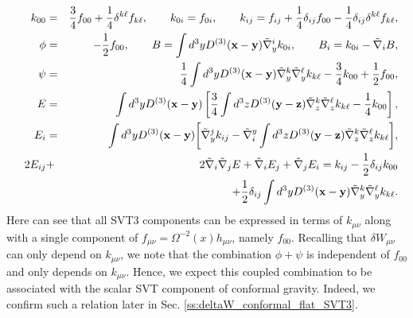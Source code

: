 \begin{eqnarray}
k_{00}&=&\frac{3}{4}f_{00}+\frac{1}{4}\delta^{k\ell}f_{k\ell},\qquad k_{0i}=f_{0i},\qquad k_{ij}=f_{ij}+\frac{1}{4}\delta_{ij}f_{00}-\frac{1}{4}\delta_{ij}\delta^{k\ell}f_{k\ell},
\nonumber\\
\phi&=&-\frac{1}{2}f_{00},\qquad
B=\int d^3yD^{(3)}(\mathbf{x}-\mathbf{y})\tilde{\nabla}_y^ik_{0i},\qquad B_i=k_{0i}-\tilde{\nabla}_iB,
\nonumber\\
\psi&=&\frac{1}{4}\int d^3yD^{(3)}(\mathbf{x}-\mathbf{y})\tilde{\nabla}_y^k\tilde{\nabla}_y^{\ell}k_{k\ell}-\frac{3}{4}k_{00}+\frac{1}{2}f_{00},
\nonumber\\
\qquad
E&=&\int d^3yD^{(3)}(\mathbf{x}-\mathbf{y})\left[\frac{3}{4}\int d^3zD^{(3)}(\mathbf{y}-\mathbf{z})\tilde{\nabla}_z^k\tilde{\nabla}_z^{\ell}k_{k\ell}-\frac{1}{4}k_{00}\right],
\nonumber\\
E_i&=&\int d^3yD^{(3)}(\mathbf{x}-\mathbf{y})\bigg{[}\tilde{\nabla}_y^jk_{ij}
-\tilde{\nabla}^y_i\int d^3zD^{(3)}(\mathbf{y}-\mathbf{z})\tilde{\nabla}_z^k\tilde{\nabla}_z^{\ell}k_{k\ell}\bigg{]},
\nonumber\\
2E_{ij}&+&2\tilde{\nabla}_i\tilde{\nabla}_j E +\tilde{\nabla}_i E_j +\tilde{\nabla}_j E_i
=k_{ij}-\frac{1}{2}\delta_{ij}k_{00}
\nonumber\\
&&\qquad\qquad\qquad\qquad\qquad\qquad+\frac{1}{2}\delta_{ij}\int d^3yD^{(3)}(\mathbf{x}-\mathbf{y})\tilde{\nabla}_y^k\tilde{\nabla}_y^{\ell}k_{k\ell}.
\label{AP66}
\end{eqnarray}
%
Here can see that all SVT3 components can be expressed in terms of $k_{\mu\nu}$ along with a single component of $f_{\mu\nu}=\Omega^{-2}(x)h_{\mu\nu}$, namely $f_{00}$.  Recalling that $\delta W_{\mu\nu}$ can only depend on $k_{\mu\nu}$, we note that the combination $\phi+\psi$ is independent of $f_{00}$ and only depends on $k_{\mu\nu}$. Hence, we expect this coupled combination to be associated with the scalar SVT component of conformal gravity. Indeed, we confirm such a relation later in Sec. \ref{ss:deltaW_conformal_flat_SVT3}.

